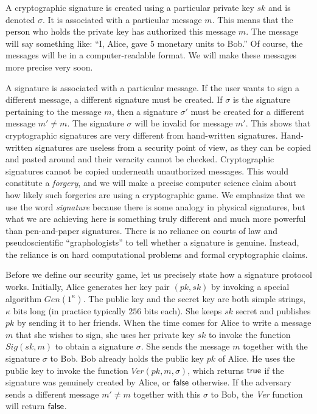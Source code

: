 A cryptographic signature is created using a particular private key $sk$ and is
denoted $\sigma$. It is associated with a particular message $m$. This means that
the person who holds the private key has authorized this message $m$. The message
will say something like: ``I, Alice, gave 5 monetary units to Bob.'' Of course, the
messages will be in a computer-readable format. We will make these messages more
precise very soon.

A signature is associated with a particular message. If the user wants to sign a
different message, a different signature must be created. If $\sigma$ is the signature
pertaining to the message $m$, then a signature $\sigma'$ must be created for a
different message $m' \neq m$. The signature $\sigma$ will be invalid for message $m'$.
This shows that cryptographic signatures are very different from hand-written signatures.
Hand-written signatures are useless from a security point of view, as they can be
copied and pasted around and their veracity cannot be checked. Cryptographic
signatures cannot be copied underneath unauthorized messages. This would constitute
a \emph{forgery}, and we will make a precise computer science claim about how
likely such forgeries are using a cryptographic game. We emphasize that we use the
word \emph{signature} because there is some analogy in physical signatures, but
what we are achieving here is something truly different and much more powerful
than pen-and-paper signatures. There is no reliance on courts of law and pseudoscientific
``graphologists'' to tell whether a signature is genuine. Instead, the reliance is
on hard computational problems and formal cryptographic claims.

Before we define our security game, let us precisely state how a signature protocol
works. Initially, Alice generates her key pair $(pk, sk)$ by invoking a special algorithm
$Gen(1^\kappa)$. The public key and the secret key are both simple strings, $\kappa$
bits long (in practice typically $256$ bits each).
She keeps $sk$ secret and publishes $pk$ by
sending it to her friends. When the time comes for Alice to write a message $m$
that she wishes to sign, she uses her private key $sk$ to invoke the function
$Sig(sk, m)$ to obtain a signature $\sigma$. She sends the message $m$ together
with the signature $\sigma$ to Bob. Bob already holds the public key $pk$ of Alice.
He uses the public key to invoke the function $Ver(pk, m, \sigma)$, which returns
$\textsf{true}$ if the signature was genuinely created by Alice, or $\textsf{false}$ otherwise.
If the adversary sends a different message $m' \neq m$ together with this $\sigma$
to Bob, the \emph{Ver} function will return $\textsf{false}$.

